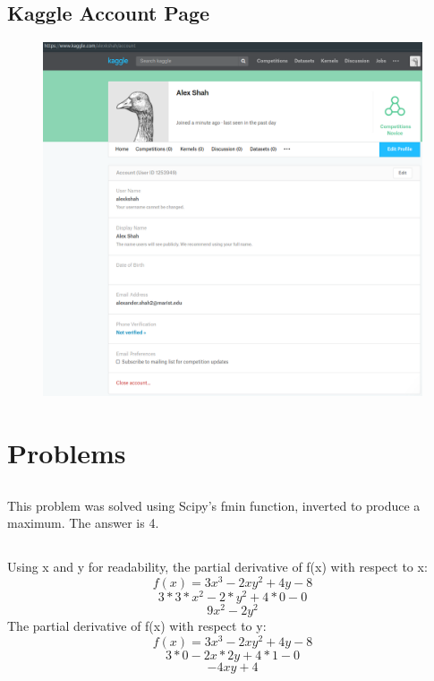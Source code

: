 \documentclass[a4paper]{article}
\begin{document}
\subsection{Kaggle Account Page}
 \begin{figure}[H]
  \includegraphics[width=\textwidth]{2-3-kaggleProof.png}  
\end{figure}

\clearpage

\section{Problems}
\subsection{}
This problem was solved using Scipy's fmin function, inverted to produce a maximum. The answer is 4.



\subsection{}
Using x and y for readability, the partial derivative of f(x) with respect to x:
\begin{equation}
f(x)=3x^3-2xy^2+4y-8
\end{equation}
\begin{equation}
3*3*x^2-2*y^2+4*0-0
\end{equation}
\begin{equation}
9x^2-2y^2
\end{equation}
The partial derivative of f(x) with respect to y:
\begin{equation}
f(x)=3x^3-2xy^2+4y-8
\end{equation}
\begin{equation}
3*0-2x*2y+4*1-0
\end{equation}
\begin{equation}
-4xy+4
\end{equation}
\end{document}
